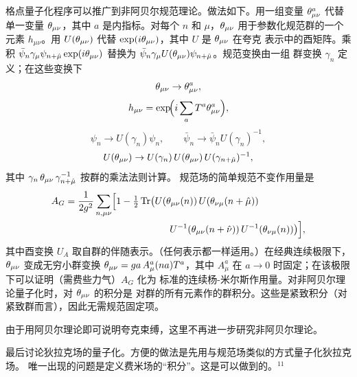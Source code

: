 格点量子化程序可以推广到非阿贝尔规范理论。做法如下。用一组变量
$\theta_{\mu\nu}^{a}$ 代替单一变量 $\theta_{\mu\nu}$，其中 $a$ 是内指标。对每个 $n$
和 $\mu$，$\theta_{\mu\nu}$ 用于参数化规范群的一个元素 $h_{\mu\nu}$。用
$U(\theta_{\mu\nu})$ 代替 $\exp(i\theta_{\mu\nu})$，其中 $U$ 是 $\theta_{\mu\nu}$ 在夸克
表示中的酉矩阵。乘积 $\bar\psi_{n}\gamma_{\mu}\psi_{n+\hat\mu}\exp(i\theta_{\mu\nu})$
替换为 $\bar\psi_{n}\gamma_{\mu}U(\theta_{\mu\nu})\psi_{n+\hat\mu}$。规范变换由一组
群变换 $\gamma_{n}$ 定义；在这些变换下
\begin{equation}
\theta_{\mu\nu} \to \theta_{\mu\nu}^{a},
\label{eq:3.25}
\end{equation}
\begin{equation}
h_{\mu\nu} = \exp\!\Bigl(i\sum_{a}T^{a}\theta_{\mu\nu}^{a}\Bigr),
\label{eq:3.26}
\end{equation}
\begin{equation}
\psi_{n} \to U(\gamma_{n})\psi_{n},\qquad
\bar\psi_{n} \to \bar\psi_{n}U(\gamma_{n})^{-1},
\label{eq:3.27}
\end{equation}
\begin{equation}
U(\theta_{\mu\nu}) \to U(\gamma_{n})\,U(\theta_{\mu\nu})\,U(\gamma_{n+\hat\mu})^{-1},
\label{eq:3.28}
\end{equation}
其中 $\gamma_{n}\,\theta_{\mu\nu}\,\gamma_{n+\hat\mu}^{-1}$ 按群的乘法法则计算。
规范场的简单规范不变作用量是
\begin{equation}
\begin{split}
A_{G} = \frac{1}{2g^{2}}\sum_{n,\mu\nu}\Bigl[1-\tfrac{1}{2}\operatorname{Tr}
    &\bigl(U(\theta_{\mu\nu}(n))\,U(\theta_{\nu\mu}(n+\hat\mu))\\
    &\qquad U^{-1}(\theta_{\mu\nu}(n+\hat\nu))\,U^{-1}(\theta_{\nu\mu}(n))\bigr)\Bigr],
\end{split}
\label{eq:3.29}
\end{equation}
其中酉变换 $U_{A}$ 取自群的伴随表示。（任何表示都一样适用。）在经典连续极限下，
$\theta_{\mu\nu}$ 变成无穷小群变换 $\theta_{\mu\nu} = ga\,A_{\mu}^{a}(na)T^{a}$，其中
$A_{\mu}^{a}$ 在 $a\to0$ 时固定；在该极限下可以证明（需费些力气）$A_{G}$ 化为
标准的连续杨-米尔斯作用量。对非阿贝尔理论量子化时，对 $\theta_{\mu\nu}$ 的积分是
对群的所有元素作的群积分。这些是紧致积分（对紧致群而言），因此无需规范固定项。

由于用阿贝尔理论即可说明夸克束缚，这里不再进一步研究非阿贝尔理论。

最后讨论狄拉克场的量子化。方便的做法是先用与规范场类似的方式量子化狄拉克场。
唯一出现的问题是定义费米场的``积分''。这是可以做到的。${}^{11}$

